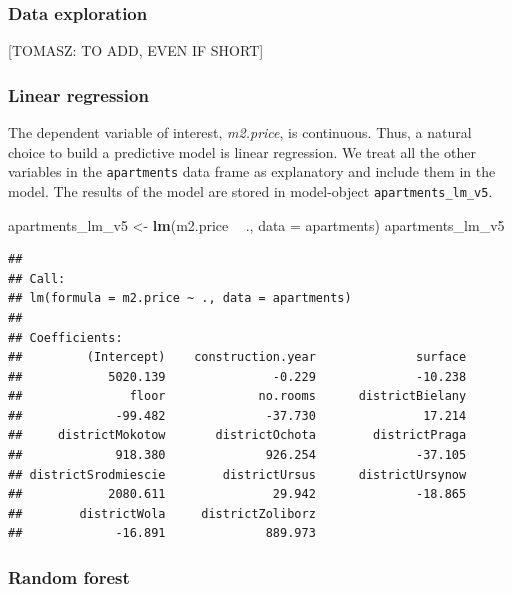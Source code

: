 \documentclass[12pt,]{krantz}
\newenvironment{Shaded}{\begin{snugshade}}{\end{snugshade}}
\newcommand{\DataTypeTok}[1]{\textcolor[rgb]{0.13,0.29,0.53}{#1}}
\newcommand{\KeywordTok}[1]{\textcolor[rgb]{0.13,0.29,0.53}{\textbf{#1}}}
\newcommand{\NormalTok}[1]{#1}
\newcommand{\OperatorTok}[1]{\textcolor[rgb]{0.81,0.36,0.00}{\textbf{#1}}}
\newcommand{\StringTok}[1]{\textcolor[rgb]{0.31,0.60,0.02}{#1}}
\theoremstyle{definition}
\theoremstyle{definition}
\theoremstyle{definition}
\theoremstyle{remark}
\begin{document}
\hypertarget{data-exploration-1}{%
\subsubsection{Data exploration}\label{data-exploration-1}}

{[}TOMASZ: TO ADD, EVEN IF SHORT{]}

\hypertarget{model_apartments_lr}{%
\subsubsection{Linear regression}\label{model_apartments_lr}}

The dependent variable of interest, \emph{m2.price}, is continuous.
Thus, a natural choice to build a predictive model is linear regression.
We treat all the other variables in the \texttt{apartments} data frame
as explanatory and include them in the model. The results of the model
are stored in model-object \texttt{apartments\_lm\_v5}.

\begin{Shaded}
\begin{Highlighting}[]
\NormalTok{apartments_lm_v5 <-}\StringTok{ }\KeywordTok{lm}\NormalTok{(m2.price }\OperatorTok{~}\StringTok{ }\NormalTok{., }\DataTypeTok{data =}\NormalTok{ apartments)}
\NormalTok{apartments_lm_v5}
\end{Highlighting}
\end{Shaded}

\begin{verbatim}
## 
## Call:
## lm(formula = m2.price ~ ., data = apartments)
## 
## Coefficients:
##         (Intercept)    construction.year              surface  
##            5020.139               -0.229              -10.238  
##               floor             no.rooms      districtBielany  
##             -99.482              -37.730               17.214  
##     districtMokotow       districtOchota        districtPraga  
##             918.380              926.254              -37.105  
## districtSrodmiescie        districtUrsus      districtUrsynow  
##            2080.611               29.942              -18.865  
##        districtWola     districtZoliborz  
##             -16.891              889.973
\end{verbatim}

\hypertarget{model_apartments_rf}{%
\subsubsection{Random forest}\label{model_apartments_rf}}
\end{document}

